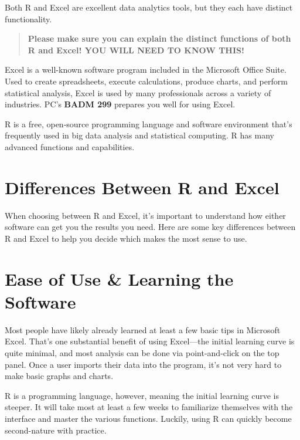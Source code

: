 \documentclass[
]{book}
\begin{document}
Both R and Excel are excellent data analytics tools, but they each have distinct functionality.

\begin{quote}
\textbf{Please make sure you can explain the distinct functions of both R and Excel! YOU WILL NEED TO KNOW THIS!}
\end{quote}

Excel is a well-known software program included in the Microsoft Office Suite. Used to create spreadsheets, execute calculations, produce charts, and perform statistical analysis, Excel is used by many professionals across a variety of industries. PC's \textbf{BADM 299} prepares you well for using Excel.

R is a free, open-source programming language and software environment that's frequently used in big data analysis and statistical computing. R has many advanced functions and capabilities.

\hypertarget{differences-between-r-and-excel}{%
\section{Differences Between R and Excel}\label{differences-between-r-and-excel}}

When choosing between R and Excel, it's important to understand how either software can get you the results you need. Here are some key differences between R and Excel to help you decide which makes the most sense to use.

\hypertarget{ease-of-use-learning-the-software}{%
\section{Ease of Use \& Learning the Software}\label{ease-of-use-learning-the-software}}

Most people have likely already learned at least a few basic tips in Microsoft Excel. That's one substantial benefit of using Excel---the initial learning curve is quite minimal, and most analysis can be done via point-and-click on the top panel. Once a user imports their data into the program, it's not very hard to make basic graphs and charts.

R is a programming language, however, meaning the initial learning curve is steeper. It will take most at least a few weeks to familiarize themselves with the interface and master the various functions. Luckily, using R can quickly become second-nature with practice.
\end{document}
